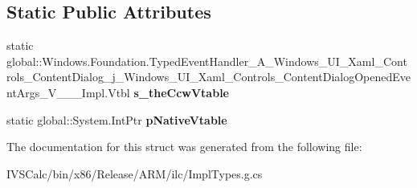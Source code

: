 \subsection*{Static Public Attributes}
\begin{DoxyCompactItemize}
\item 
\mbox{\label{struct_windows_1_1_foundation_1_1_typed_event_handler___a___windows___u_i___xaml___controls___co7eff74cfd44b375ec88a14fae1c258be_a69fef0c73f65828050fab1aa51b55a61}} 
static global\+::\+Windows.\+Foundation.\+Typed\+Event\+Handler\+\_\+\+A\+\_\+\+Windows\+\_\+\+U\+I\+\_\+\+Xaml\+\_\+\+Controls\+\_\+\+Content\+Dialog\+\_\+j\+\_\+\+Windows\+\_\+\+U\+I\+\_\+\+Xaml\+\_\+\+Controls\+\_\+\+Content\+Dialog\+Opened\+Event\+Args\+\_\+\+V\+\_\+\+\_\+\+\_\+\+Impl.\+Vtbl {\bfseries s\+\_\+the\+Ccw\+Vtable}
\item 
\mbox{\label{struct_windows_1_1_foundation_1_1_typed_event_handler___a___windows___u_i___xaml___controls___co7eff74cfd44b375ec88a14fae1c258be_aa69f30fca1040ba44add329c559efb9a}} 
static global\+::\+System.\+Int\+Ptr {\bfseries p\+Native\+Vtable}
\end{DoxyCompactItemize}


The documentation for this struct was generated from the following file\+:\begin{DoxyCompactItemize}
\item 
I\+V\+S\+Calc/bin/x86/\+Release/\+A\+R\+M/ilc/Impl\+Types.\+g.\+cs\end{DoxyCompactItemize}
